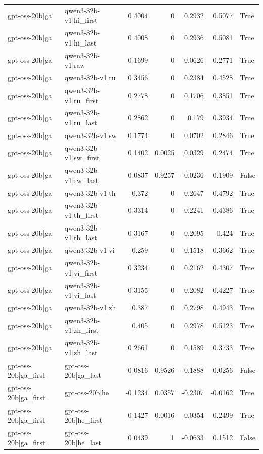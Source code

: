 \begin{table}
\begin{tabular}{l l r r r r l}
gpt-oss-20b|ga & qwen3-32b-v1|hi_first & 0.4004 & 0 & 0.2932 & 0.5077 & True \\
gpt-oss-20b|ga & qwen3-32b-v1|hi_last & 0.4008 & 0 & 0.2936 & 0.5081 & True \\
gpt-oss-20b|ga & qwen3-32b-v1|raw & 0.1699 & 0 & 0.0626 & 0.2771 & True \\
gpt-oss-20b|ga & qwen3-32b-v1|ru & 0.3456 & 0 & 0.2384 & 0.4528 & True \\
gpt-oss-20b|ga & qwen3-32b-v1|ru_first & 0.2778 & 0 & 0.1706 & 0.3851 & True \\
gpt-oss-20b|ga & qwen3-32b-v1|ru_last & 0.2862 & 0 & 0.179 & 0.3934 & True \\
gpt-oss-20b|ga & qwen3-32b-v1|sw & 0.1774 & 0 & 0.0702 & 0.2846 & True \\
gpt-oss-20b|ga & qwen3-32b-v1|sw_first & 0.1402 & 0.0025 & 0.0329 & 0.2474 & True \\
gpt-oss-20b|ga & qwen3-32b-v1|sw_last & 0.0837 & 0.9257 & -0.0236 & 0.1909 & False \\
gpt-oss-20b|ga & qwen3-32b-v1|th & 0.372 & 0 & 0.2647 & 0.4792 & True \\
gpt-oss-20b|ga & qwen3-32b-v1|th_first & 0.3314 & 0 & 0.2241 & 0.4386 & True \\
gpt-oss-20b|ga & qwen3-32b-v1|th_last & 0.3167 & 0 & 0.2095 & 0.424 & True \\
gpt-oss-20b|ga & qwen3-32b-v1|vi & 0.259 & 0 & 0.1518 & 0.3662 & True \\
gpt-oss-20b|ga & qwen3-32b-v1|vi_first & 0.3234 & 0 & 0.2162 & 0.4307 & True \\
gpt-oss-20b|ga & qwen3-32b-v1|vi_last & 0.3155 & 0 & 0.2082 & 0.4227 & True \\
gpt-oss-20b|ga & qwen3-32b-v1|zh & 0.387 & 0 & 0.2798 & 0.4943 & True \\
gpt-oss-20b|ga & qwen3-32b-v1|zh_first & 0.405 & 0 & 0.2978 & 0.5123 & True \\
gpt-oss-20b|ga & qwen3-32b-v1|zh_last & 0.2661 & 0 & 0.1589 & 0.3733 & True \\
gpt-oss-20b|ga_first & gpt-oss-20b|ga_last & -0.0816 & 0.9526 & -0.1888 & 0.0256 & False \\
gpt-oss-20b|ga_first & gpt-oss-20b|he & -0.1234 & 0.0357 & -0.2307 & -0.0162 & True \\
gpt-oss-20b|ga_first & gpt-oss-20b|he_first & 0.1427 & 0.0016 & 0.0354 & 0.2499 & True \\
gpt-oss-20b|ga_first & gpt-oss-20b|he_last & 0.0439 & 1 & -0.0633 & 0.1512 & False \\

\end{tabular}
\end{table}
